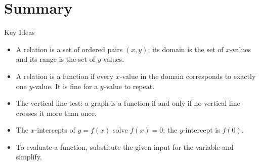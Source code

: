 \documentclass[12pt]{article}
\begin{document}
  

\section*{Summary}

\begin{friendlyrule}{Key Ideas}
\begin{itemize}
    \item A relation is a set of ordered pairs $(x,y)$; its domain is the set of $x$-values and its range is the set of $y$-values.
    \item A relation is a function if every $x$-value in the domain corresponds to exactly one $y$-value. It is fine for a $y$-value to repeat.
    \item The vertical line test: a graph is a function if and only if no vertical line crosses it more than once.
    \item The $x$-intercepts of $y=f(x)$ solve $f(x)=0$; the $y$-intercept is $f(0)$.
    \item To evaluate a function, substitute the given input for the variable and simplify.
\end{itemize}
\end{friendlyrule}
\end{document}
